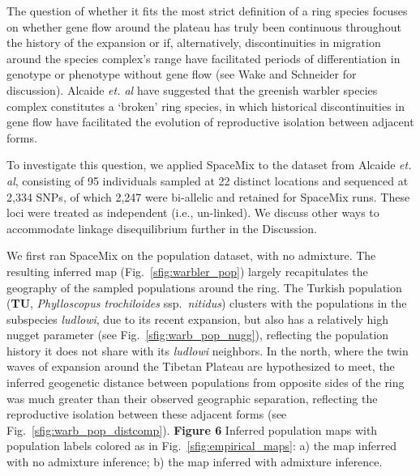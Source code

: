 \documentclass[10pt,letterpaper]{article}
\begin{document}
The question of whether it fits the most strict definition of a ring species focuses on whether gene flow around the plateau has truly been continuous throughout the history of the expansion or if, alternatively, discontinuities in migration around the species complex's range have facilitated periods of differentiation in genotype or phenotype without gene flow \cite{Mayr1942, Mayr1970, coyne_orr_speciation} (see Wake and Schneider \cite{wake_schneider1998} for discussion). 
Alcaide \emph{et. al} \cite{alcaide2014genomic} have suggested that the greenish warbler species complex constitutes a `broken' ring species, in which historical discontinuities in gene flow have facilitated the evolution of reproductive isolation between adjacent forms.  

To investigate this question, we applied SpaceMix to the dataset from Alcaide \emph{et. al}\cite{alcaide2014genomic}, 
consisting of 95 individuals sampled at 22 distinct locations and sequenced at 2,334 SNPs, of which 2,247 were bi-allelic and retained for SpaceMix runs.  These loci were treated as independent (i.e., un-linked).  We discuss other ways to accommodate linkage disequilibrium further in the Discussion.

We first ran SpaceMix on the population dataset, with no admixture. The resulting inferred map (Fig.\ \ref{sfig:warbler_pop}) largely recapitulates the geography of the sampled populations around the ring.  The Turkish population (\textbf{TU}, \textit{Phylloscopus trochiloides} ssp.\ \textit{nitidus}) clusters with the populations in the subspecies \textit{ludlowi}, due to its recent expansion, but also has a relatively high nugget parameter (see Fig.\ \ref{sfig:warb_pop_nugg}), reflecting the population history it does not share with its \textit{ludlowi} neighbors.  In the north, where the twin waves of expansion around the Tibetan Plateau are hypothesized to meet, the inferred geogenetic distance between populations from opposite sides of the ring was much greater than their observed geographic separation, reflecting the reproductive isolation between these adjacent forms (see Fig.\ \ref{sfig:warb_pop_distcomp}).  
%
\newline\newline
{\bf{Figure 6}} Inferred population maps with population labels colored as in Fig.\ \ref{sfig:empirical_maps}: a) the map inferred with no admixture inference; b) the map inferred with admixture inference.
\newline\newline
\end{document}
